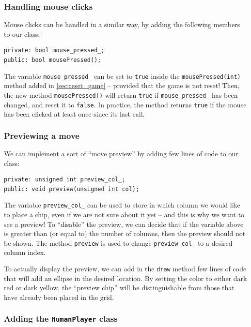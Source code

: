 \documentclass{article}
\begin{document}
\subsubsection{Handling mouse clicks}

Mouse clicks can be handled in a similar way, by adding the following members to our class:
\begin{lstlisting}[style=mycpp,numbers=none]
private: bool mouse_pressed_;
public: bool mousePressed();
\end{lstlisting}
The variable \texttt{mouse\string_pressed\string_} can be set to \texttt{true} inside the \texttt{mousePressed(int)} method added in \cref{sec:reset_game} -- provided that the game is not reset! Then, the new method \texttt{mousePressed()} will return \texttt{true} if \texttt{mouse\string_pressed\string_} has been changed, and reset it to \texttt{false}. In practice, the method returns \texttt{true} if the mouse has been clicked at least once since its last call.


\subsubsection{Previewing a move}

We can implement a sort of ``move preview'' by adding few lines of code to our class:
\begin{lstlisting}[style=mycpp,numbers=none]
private: unsigned int preview_col_;
public: void preview(unsigned int col);
\end{lstlisting}
The variable \texttt{preview\string_col\string_} can be used to store in which column we would like to place a chip, even if we are not sure about it yet -- and this is why we want to see a preview! To ``disable'' the preview, we can decide that if the variable above is greater than (or equal to) the number of columns, then the preview should not be shown. The method \texttt{preview} is used to change \texttt{preview\string_col\string_} to a desired column index.

To actually display the preview, we can add in the \texttt{draw} method few lines of code that will add an ellipse in the desired location. By setting the color to either dark red or dark yellow, the ``preview chip'' will be distinguishable from those that have already been placed in the grid.


\subsubsection{Adding the \texttt{HumanPlayer} class}
\end{document}
